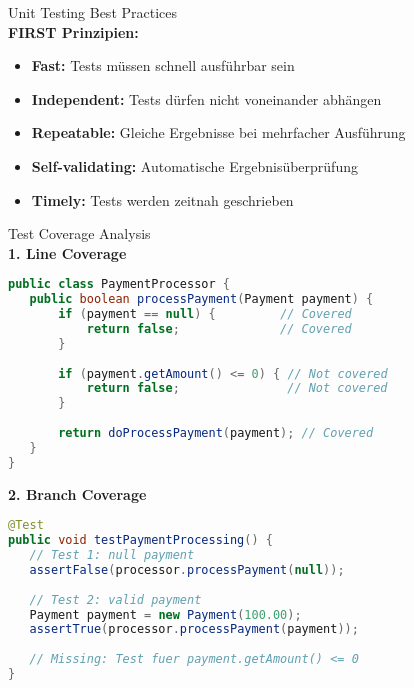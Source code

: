 \begin{example2}{Unit Testing Best Practices}\\
\textbf{FIRST Prinzipien:}
\begin{itemize}
   \item \textbf{Fast:} Tests müssen schnell ausführbar sein
   \item \textbf{Independent:} Tests dürfen nicht voneinander abhängen
   \item \textbf{Repeatable:} Gleiche Ergebnisse bei mehrfacher Ausführung
   \item \textbf{Self-validating:} Automatische Ergebnisüberprüfung
   \item \textbf{Timely:} Tests werden zeitnah geschrieben
\end{itemize}
\end{example2}

\begin{example2}{Test Coverage Analysis}\\
\textbf{1. Line Coverage}
\begin{lstlisting}[language=Java, style=basesmol]
public class PaymentProcessor {
   public boolean processPayment(Payment payment) {
       if (payment == null) {         // Covered
           return false;              // Covered
       }
       
       if (payment.getAmount() <= 0) { // Not covered
           return false;               // Not covered
       }
       
       return doProcessPayment(payment); // Covered
   }
}
\end{lstlisting}

\textbf{2. Branch Coverage}
\begin{lstlisting}[language=Java, style=basesmol]
@Test
public void testPaymentProcessing() {
   // Test 1: null payment
   assertFalse(processor.processPayment(null));
   
   // Test 2: valid payment
   Payment payment = new Payment(100.00);
   assertTrue(processor.processPayment(payment));
   
   // Missing: Test fuer payment.getAmount() <= 0
}
\end{lstlisting}
\end{example2}

